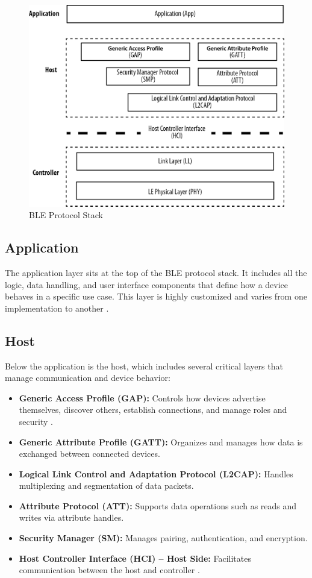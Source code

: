 \begin{figure}[h]
    \caption{BLE Protocol Stack}
    \includegraphics{bleprotocolstack.png}
    \end{figure}

\subsection{Application}

The application layer sits at the top of the BLE protocol stack. It includes all the logic, data handling, and user interface components that define how a device behaves in a specific use case. This layer is highly customized and varies from one implementation to another \cite{nextgenBLE}.

\subsection{Host}

Below the application is the host, which includes several critical layers that manage communication and device behavior:

\begin{itemize}
    \item \textbf{Generic Access Profile (GAP):} Controls how devices advertise themselves, discover others, establish connections, and manage roles and security \cite{nextgenBLE}.
    \item \textbf{Generic Attribute Profile (GATT):} Organizes and manages how data is exchanged between connected devices.
    \item \textbf{Logical Link Control and Adaptation Protocol (L2CAP):} Handles multiplexing and segmentation of data packets.
    \item \textbf{Attribute Protocol (ATT):} Supports data operations such as reads and writes via attribute handles.
    \item \textbf{Security Manager (SM):} Manages pairing, authentication, and encryption.
    \item \textbf{Host Controller Interface (HCI) – Host Side:} Facilitates communication between the host and controller \cite{nextgenBLE}.
\end{itemize}

